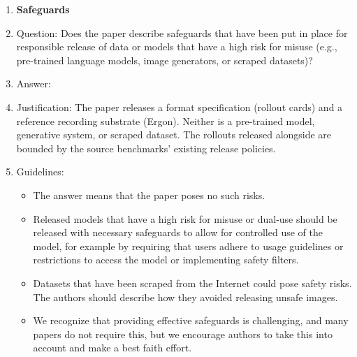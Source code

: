 \begin{enumerate}
\item {\bf Safeguards}
    \item[] Question: Does the paper describe safeguards that have been put in place for responsible release of data or models that have a high risk for misuse (e.g., pre-trained language models, image generators, or scraped datasets)?
    \item[] Answer: \answerNA{}
    \item[] Justification: The paper releases a format specification (rollout cards) and a reference recording substrate (Ergon). Neither is a pre-trained model, generative system, or scraped dataset. The rollouts released alongside are bounded by the source benchmarks' existing release policies.
    \item[] Guidelines:
    \begin{itemize}
        \item The answer \answerNA{} means that the paper poses no such risks.
        \item Released models that have a high risk for misuse or dual-use should be released with necessary safeguards to allow for controlled use of the model, for example by requiring that users adhere to usage guidelines or restrictions to access the model or implementing safety filters.
        \item Datasets that have been scraped from the Internet could pose safety risks. The authors should describe how they avoided releasing unsafe images.
        \item We recognize that providing effective safeguards is challenging, and many papers do not require this, but we encourage authors to take this into account and make a best faith effort.
    \end{itemize}


\end{enumerate}
